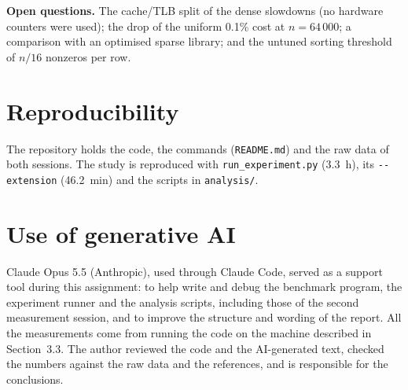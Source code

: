\documentclass[11pt,a4paper]{article}
\begin{document}
\textbf{Open questions.} The cache/TLB split of the dense slowdowns (no hardware counters were
used); the drop of the uniform 0.1\% cost at $n = 64\,000$; a comparison with an optimised
sparse library; and the untuned sorting threshold of $n/16$ nonzeros per row.

\section*{Reproducibility}

The repository holds the code, the commands (\texttt{README.md}) and the raw data of both
sessions. The study is reproduced with \texttt{run\_experiment.py} (3.3~h), its
\texttt{-{}-extension} (46.2~min) and the scripts in \texttt{analysis/}.

\section*{Use of generative AI}

Claude Opus 5.5 (Anthropic), used through Claude Code, served
as a support tool during this assignment: to help write and debug the benchmark program, the
experiment runner and the analysis scripts, including those of the second measurement
session, and to improve the structure and wording of the report. All the measurements come
from running the code on the machine described in Section~3.3. The author reviewed the code
and the AI-generated text, checked the numbers against the raw data and the references, and
is responsible for the conclusions.
\end{document}

